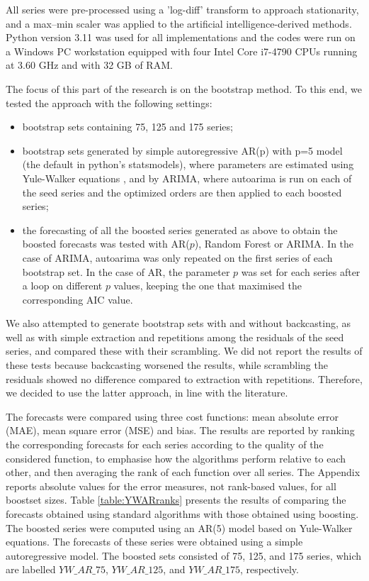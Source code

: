 \documentclass[preprint,11pt,authoryear]{elsarticle}
\begin{document}
All series were pre-processed using a 'log-diff' transform to approach stationarity, and a max–min scaler was applied to the artificial intelligence-derived methods. Python version 3.11 was used for all implementations and the codes were run on a Windows PC workstation equipped with four Intel Core i7-4790 CPUs running at 3.60 GHz and with 32 GB of RAM.

The focus of this part of the research is on the bootstrap method. To this end, we tested the approach with the following settings:
\begin{itemize}
	\item bootstrap sets containing 75, 125 and 175 series;
	\item bootstrap sets generated by simple autoregressive AR(p) with p=5 model (the default in python's statsmodels), where parameters are estimated using Yule-Walker equations \citep{BD91}, and by ARIMA, where autoarima is run on each of the seed series and the optimized orders are then applied to each boosted series;
	\item the forecasting of all the boosted series generated as above to obtain the boosted forecasts was tested with AR($p$), Random Forest or ARIMA. In the case of ARIMA, autoarima was only repeated on the first series of each bootstrap set. In the case of AR, the parameter $p$ was set for each series after a loop on different $p$ values, keeping the one that maximised the corresponding AIC value.
\end{itemize}

We also attempted to generate bootstrap sets with and without backcasting, as well as with simple extraction and repetitions among the residuals of the seed series, and compared these with their scrambling. We did not report the results of these tests because backcasting worsened the results, while scrambling the residuals showed no difference compared to extraction with repetitions. Therefore, we decided to use the latter approach, in line with the literature.

The forecasts were compared using three cost functions: mean absolute error (MAE), mean square error (MSE) and bias. The results are reported by ranking the corresponding forecasts for each series according to the quality of the considered function, to emphasise how the algorithms perform relative to each other, and then averaging the rank of each function over all series. The Appendix reports absolute values for the error measures, not rank-based values, for all boostset sizes. 
Table \ref{table:YWARranks} presents the results of comparing the forecasts obtained using standard algorithms with those obtained using boosting. The boosted series were computed using an AR(5) model based on Yule-Walker equations. The forecasts of these series were obtained using a simple autoregressive model. The boosted sets consisted of 75, 125, and 175 series, which are labelled $YW\_AR\_75$, $YW\_AR\_125$, and $YW\_AR\_175$, respectively.
\end{document}
